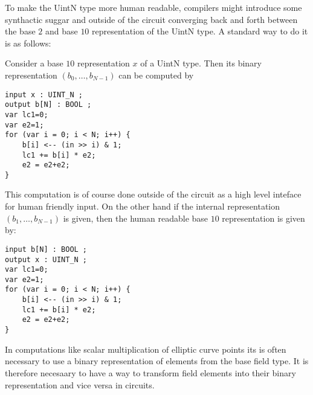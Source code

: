To make the UintN type more human readable, compilers might introduce some synthactic suggar and outside of the circuit converging back and forth between the base $2$ and base $10$ representation of the UintN type. A standard way to do it is as follows: 

Consider a base $10$ representation $x$ of a UintN type. Then its binary representation 
$(b_0,\ldots,b_{N-1})$ can be computed by 
\begin{lstlisting}
input x : UINT_N ; 
output b[N] : BOOL ; 
var lc1=0;
var e2=1;
for (var i = 0; i < N; i++) {
    b[i] <-- (in >> i) & 1;
    lc1 += b[i] * e2;
    e2 = e2+e2;
}
\end{lstlisting}
This computation is of course done outside of the circuit as a high level inteface for human friendly input. On the other hand if the internal representation $(b_1,\ldots, b_{N-1})$ is given, then the human readable base $10$ representation is given by:
\begin{lstlisting}
input b[N] : BOOL ; 
output x : UINT_N ; 
var lc1=0;
var e2=1;
for (var i = 0; i < N; i++) {
    b[i] <-- (in >> i) & 1;
    lc1 += b[i] * e2;
    e2 = e2+e2;
}
\end{lstlisting}



In computations like scalar multiplication of elliptic curve points its is often necessary to use a binary representation of elements from the base field type. It is therefore necesaary to have a way to transform field elements into their binary representation and vice versa in circuits.

